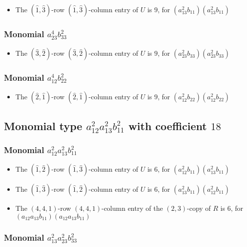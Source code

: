 \documentclass{article}
\begin{document}
\begin{itemize}
\item The $(\hat{1}, \hat{3})$-row $(\hat{1}, \hat{3})$-column entry of $U$ is $9$, for $( a_{13}^{2} b_{11} )( a_{13}^{2} b_{11} )$ 
\end{itemize}
\subsubsection{Monomial $ a_{23}^{4} b_{33}^{2} $}

\begin{itemize}
\item The $(\hat{3}, \hat{2})$-row $(\hat{3}, \hat{2})$-column entry of $U$ is $9$, for $( a_{23}^{2} b_{33} )( a_{23}^{2} b_{33} )$ 
\end{itemize}
\subsubsection{Monomial $ a_{12}^{4} b_{22}^{2} $}

\begin{itemize}
\item The $(\hat{2}, \hat{1})$-row $(\hat{2}, \hat{1})$-column entry of $U$ is $9$, for $( a_{12}^{2} b_{22} )( a_{12}^{2} b_{22} )$ 
\end{itemize}
\subsection{Monomial type $ a_{12}^{2} a_{13}^{2} b_{11}^{2} $ with coefficient $ 18 $}

\subsubsection{Monomial $ a_{12}^{2} a_{13}^{2} b_{11}^{2} $}

\begin{itemize}
\item The $(\hat{1}, \hat{2})$-row $(\hat{1}, \hat{3})$-column entry of $U$ is $6$, for $( a_{12}^{2} b_{11} )( a_{13}^{2} b_{11} )$ 
\item The $(\hat{1}, \hat{3})$-row $(\hat{1}, \hat{2})$-column entry of $U$ is $6$, for $( a_{13}^{2} b_{11} )( a_{12}^{2} b_{11} )$ 
\item The $(4, 4, 1)$-row $(4, 4, 1)$-column entry of the $ \left(2, 3\right) $-copy of $R$ is $ 6 $, for $( a_{12} a_{13} b_{11} )( a_{12} a_{13} b_{11} )$ 
\end{itemize}
\subsubsection{Monomial $ a_{13}^{2} a_{23}^{2} b_{33}^{2} $}
\end{document}
